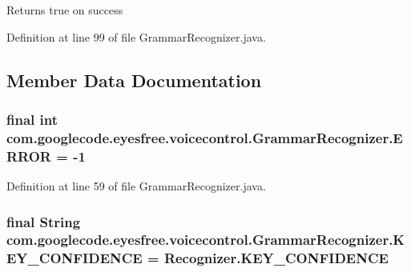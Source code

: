\begin{DoxyReturn}{Returns}
{\ttfamily true} on success 
\end{DoxyReturn}


Definition at line 99 of file Grammar\-Recognizer.\-java.



\subsection{Member Data Documentation}
\hypertarget{classcom_1_1googlecode_1_1eyesfree_1_1voicecontrol_1_1_grammar_recognizer_a5e17fa7461528dfc7eb4360c07360b80}{
\subsubsection[{E\-R\-R\-O\-R}]{\setlength{\rightskip}{0pt plus 5cm}final int {\bf com.\-googlecode.\-eyesfree.\-voicecontrol.\-Grammar\-Recognizer.\-E\-R\-R\-O\-R} = -\/1}}\label{classcom_1_1googlecode_1_1eyesfree_1_1voicecontrol_1_1_grammar_recognizer_a5e17fa7461528dfc7eb4360c07360b80}


Definition at line 59 of file Grammar\-Recognizer.\-java.

\hypertarget{classcom_1_1googlecode_1_1eyesfree_1_1voicecontrol_1_1_grammar_recognizer_adb985941250757b2c8cdc4ac5713a4e9}{
\subsubsection[{K\-E\-Y\-\_\-\-C\-O\-N\-F\-I\-D\-E\-N\-C\-E}]{\setlength{\rightskip}{0pt plus 5cm}final String {\bf com.\-googlecode.\-eyesfree.\-voicecontrol.\-Grammar\-Recognizer.\-K\-E\-Y\-\_\-\-C\-O\-N\-F\-I\-D\-E\-N\-C\-E} = Recognizer.\-K\-E\-Y\-\_\-\-C\-O\-N\-F\-I\-D\-E\-N\-C\-E}}\label{classcom_1_1googlecode_1_1eyesfree_1_1voicecontrol_1_1_grammar_recognizer_adb985941250757b2c8cdc4ac5713a4e9}


